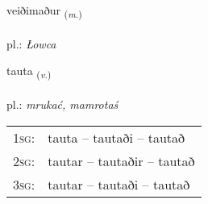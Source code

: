 \documentclass[frontgrid, backgrid]{flacards}\usepackage[]{graphicx}\usepackage[]{xcolor}
\begin{document}
\renewcommand{\flhead}{\vskip5pt \fboxsep=0pt {\small\bfseries\footnotesize Nafnorð | rzeczownik}}
\renewcommand{\fcfoot}{\vskip5pt \fboxsep=0pt \hspace{2pt}{\small\bfseries\footnotesize 3K}}

\renewcommand{\blhead}{\vskip5pt {\small\bfseries\footnotesize Nafnorð | rzeczownik }}
\renewcommand{\bcfoot}{\vskip5pt \hspace{2pt}{\small\bfseries\footnotesize 3K}}


{veiðimaður \small{\textsubscript{(\textit{m.})}} \\[1ex] %
\textphonetic{[veiːðɪmaðʏr]} \\
pl.: \emph{Łowca} \\  [2ex]
\renewcommand*{\arraystretch}{0.8}
}

\renewcommand{\flhead}{\vskip5pt \fboxsep=0pt {\small\bfseries\footnotesize Sagnorð | czasownik}}
\renewcommand{\fcfoot}{\vskip5pt \fboxsep=0pt \hspace{2pt}{\small\bfseries\footnotesize 3K}}

\renewcommand{\blhead}{\vskip5pt {\small\bfseries\footnotesize Sagnorð | czasownik }}
\renewcommand{\bcfoot}{\vskip5pt \hspace{2pt}{\small\bfseries\footnotesize 3K}}


{tauta \small{\textsubscript{(\textit{v.})}} \\[1ex] %
\textphonetic{[tʰœiːta]} \\
pl.: \emph{mrukać, mamrotaś} \\  [2ex]
\renewcommand*{\arraystretch}{0.8}
\begin{tabular}{p{1cm}l}
\textsc{1sg}: & tauta -- tautaði -- tautað \\ 
\textsc{2sg}: & tautar -- tautaðir -- tautað \\ 
\textsc{3sg}: & tautar -- tautaði -- tautað \\ 
\end{tabular}
}
\end{document}
